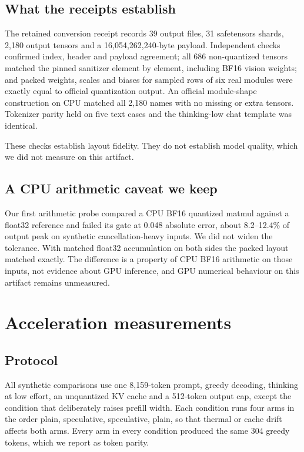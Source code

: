\documentclass[11pt]{article}
\begin{document}
\subsection{What the receipts establish}
The retained conversion receipt records 39 output files, 31 safetensors shards, 2{,}180 output tensors and a 16{,}054{,}262{,}240-byte payload. Independent checks confirmed index, header and payload agreement; all 686 non-quantized tensors matched the pinned sanitizer element by element, including BF16 vision weights; and packed weights, scales and biases for sampled rows of six real modules were exactly equal to official quantization output. An official module-shape construction on CPU matched all 2{,}180 names with no missing or extra tensors. Tokenizer parity held on five text cases and the thinking-low chat template was identical.

These checks establish layout fidelity. They do not establish model quality, which we did not measure on this artifact.

\subsection{A CPU arithmetic caveat we keep}
Our first arithmetic probe compared a CPU BF16 quantized matmul against a float32 reference and failed its gate at 0.048 absolute error, about 8.2--12.4\% of output peak on synthetic cancellation-heavy inputs. We did not widen the tolerance. With matched float32 accumulation on both sides the packed layout matched exactly. The difference is a property of CPU BF16 arithmetic on those inputs, not evidence about GPU inference, and GPU numerical behaviour on this artifact remains unmeasured.

\section{Acceleration measurements}
\subsection{Protocol}
All synthetic comparisons use one 8{,}159-token prompt, greedy decoding, thinking at low effort, an unquantized KV cache and a 512-token output cap, except the condition that deliberately raises prefill width. Each condition runs four arms in the order plain, speculative, speculative, plain, so that thermal or cache drift affects both arms. Every arm in every condition produced the same 304 greedy tokens, which we report as token parity.
\end{document}
